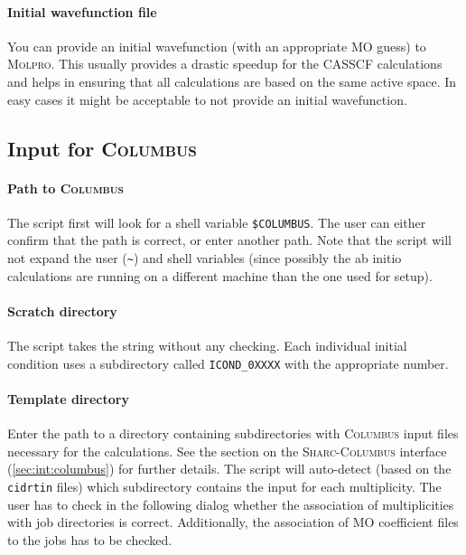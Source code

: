 \documentclass[a4paper,11pt,DIV=15,openany,twoside=false]{scrbook}
\newcommand{\sharc}{\textsc{Sharc}}
\newcommand{\ttt}[1]{\texttt{#1}}
\begin{document}
\paragraph{Initial wavefunction file}

You can provide an initial wavefunction (with an appropriate MO guess) to \textsc{Molpro}. This usually provides a drastic speedup for the CASSCF calculations and helps in ensuring that all calculations are based on the same active space. In easy cases it might be acceptable to not provide an initial wavefunction.

\subsection{Input for \textsc{Columbus}}

\paragraph{Path to \textsc{Columbus}}

The script first will look for a shell variable \ttt{\$COLUMBUS}. The user can either confirm that the path is correct, or enter another path. Note that the script will not expand the user (\ttt{\textasciitilde}) and shell variables (since possibly the ab initio calculations are running on a different machine than the one used for setup).

\paragraph{Scratch directory}

The script takes the string without any checking. Each individual initial condition uses a subdirectory called \ttt{ICOND\_0XXXX} with the appropriate number. 

\paragraph{Template directory}

Enter the path to a directory containing subdirectories with \textsc{Columbus} input files necessary for the calculations. See the section on the \sharc-\textsc{Columbus} interface (\ref{sec:int:columbus}) for further details. The script will auto-detect (based on the \ttt{cidrtin} files) which subdirectory contains the input for each multiplicity. The user has to check in the following dialog whether the association of multiplicities with job directories is correct. Additionally, the association of MO coefficient files to the jobs has to be checked.
\end{document}

